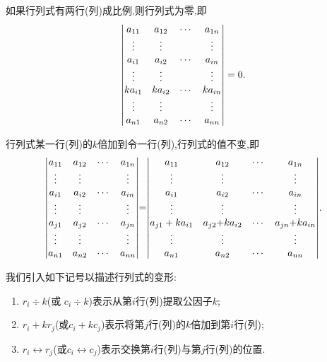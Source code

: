 \documentclass[9pt,a4paper]{book}
\begin{document}
\begin{feature}
	如果行列式有两行(列)成比例,则行列式为零,即\[  {\begin{vmatrix}
		{{a_{11}}}&{{a_{12}}}& \cdots &{{a_{1n}}}\\
		\vdots & \vdots &{\rm{ }}& \vdots \\
		{{a_{i1}}}&{{a_{i2}}}& \cdots &{{a_{in}}}\\
		\vdots & \vdots &{\rm{ }}& \vdots \\
		{k{a_{i1}}}&{k{a_{i2}}}& \cdots &{k{a_{in}}}\\
		\vdots & \vdots &{\rm{ }}& \vdots \\
		{{a_{n1}}}&{{a_{n2}}}& \cdots &{{a_{nn}}}
		\end{vmatrix}} =0. \]
\end{feature}
\begin{feature}
	行列式某一行(列)的$ k $倍加到令一行(列),行列式的值不变,即\[  {\begin{vmatrix}
		{{a_{11}}}&{{a_{12}}}& \cdots &{{a_{1n}}}\\
		\vdots & \vdots &{\rm{ }}& \vdots \\
		{{a_{i1}}}&{{a_{i2}}}& \cdots &{{a_{in}}}\\
		\vdots & \vdots &{\rm{ }}& \vdots \\
		{{a_{j1}}}&{{a_{j2}}}& \cdots &{{a_{jn}}}\\
		\vdots & \vdots &{\rm{ }}& \vdots \\
		{{a_{n1}}}&{{a_{n2}}}& \cdots &{{a_{nn}}}
		\end{vmatrix}} {\rm{ = }} {\begin{vmatrix}
		{{a_{11}}}&{{a_{12}}}& \cdots &{{a_{1n}}}\\
		\vdots & \vdots &{\rm{ }}& \vdots \\
		{{a_{i1}}}&{{a_{i2}}}& \cdots &{{a_{in}}}\\
		\vdots & \vdots &{\rm{ }}& \vdots \\
		{{a_{j1}} + k{a_{i1}}}&{{a_{j2}}{\rm{ + }}k{a_{i2}}}& \cdots &{{a_{jn}}{\rm{ + }}k{a_{in}}}\\
		\vdots & \vdots &{\rm{ }}& \vdots \\
		{{a_{n1}}}&{{a_{n2}}}& \cdots &{{a_{nn}}}
		\end{vmatrix}} . \]
\end{feature}
\begin{defination}
	我们引入如下记号以描述行列式的变形:
	\begin{enumerate}
		\item $ r_i\div k $(或 $ c_i\div k $)表示从第$ i $行(列)提取公因子$ k $;
		\item $ r_i+kr_j $(或$ c_i+kc_j $)表示将第$ j $行(列)的$ k $倍加到第$ i $行(列);
		\item $ r_i\leftrightarrow r_j $(或$ c_i\leftrightarrow c_j $)表示交换第$ i $行(列)与第$ j $行(列)的位置.
	\end{enumerate}
\end{defination}
\end{document}
